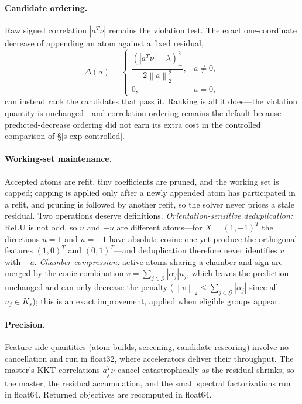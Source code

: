 \documentclass[12pt]{article}
\theoremstyle{plain}
\theoremstyle{definition}
\newcommand{\norm}[1]{\left\lVert #1\right\rVert}
\newcommand{\relu}[1]{\left(#1\right)_+}
\begin{document}
\paragraph{Candidate ordering.}
Raw signed correlation $|a^T\nu|$ remains the violation test. The exact
one-coordinate decrease of appending an atom against a fixed residual,
\begin{equation}\label{e-decrease}
   \Delta(a)=
   \begin{cases}
    \dfrac{\relu{|a^T\nu|-\lambda}^2}{2\norm a_2^2},&a\ne0,\\[1ex]
    0,&a=0,
   \end{cases}
\end{equation}
can instead rank the candidates that pass it. Ranking is all it does---the
violation quantity is unchanged---and correlation ordering remains the
default because predicted-decrease ordering did not earn its extra cost in
the controlled comparison of \S\ref{s-exp-controlled}.

\paragraph{Working-set maintenance.}
Accepted atoms are refit, tiny coefficients are pruned, and the working set
is capped; capping is applied only after a newly appended atom has
participated in a refit, and pruning is followed by another refit, so the
solver never prices a stale residual. Two operations deserve definitions.
\emph{Orientation-sensitive deduplication:} ReLU is not odd, so $u$ and $-u$
are different atoms---for $X=(1,-1)^T$ the directions $u=1$ and $u=-1$ have
absolute cosine one yet produce the orthogonal features $(1,0)^T$ and
$(0,1)^T$---and deduplication therefore never identifies $u$ with $-u$.
\emph{Chamber compression:} active atoms sharing a chamber and sign are
merged by the conic combination $v=\sum_{j\in\mathcal G}|\alpha_j|u_j$, which
leaves the prediction unchanged and can only decrease the penalty
($\norm v_2\le\sum_{j\in\mathcal G}|\alpha_j|$ since all $u_j\in K_s$); this is an
exact improvement, applied when eligible groups appear.

\paragraph{Precision.}
Feature-side quantities (atom builds, screening, candidate rescoring) involve
no cancellation and run in float32, where accelerators deliver their
throughput. The master's KKT correlations $a_j^T\nu$ cancel catastrophically
as the residual shrinks, so the master, the residual accumulation, and the
small spectral factorizations run in float64. Returned objectives are
recomputed in float64.
\end{document}
